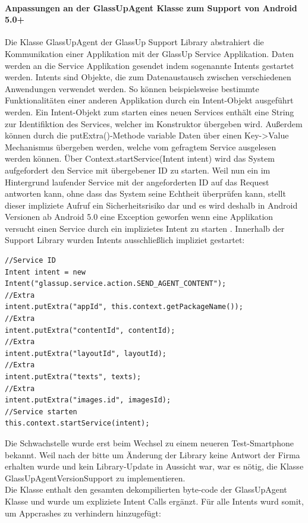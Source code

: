 \paragraph{Anpassungen an der GlassUpAgent Klasse zum Support von Android 5.0+}
Die Klasse GlassUpAgent der GlassUp Support Library abstrahiert die Kommunikation einer Applikation mit der GlassUp Service Applikation. Daten werden an die Service Applikation gesendet indem sogenannte Intents gestartet werden. Intents sind Objekte, die zum Datenaustausch zwischen verschiedenen Anwendungen verwendet werden. So können beispielsweise bestimmte Funktionalitäten einer anderen Applikation durch ein Intent-Objekt ausgeführt werden\cite{android_intents_2017}.
Ein Intent-Objekt zum starten eines neuen Services enthält eine String zur Identifiktion des Services, welcher im Konstruktor übergeben wird. Außerdem können durch die putExtra()-Methode variable Daten über einen Key->Value Mechanismus übergeben werden, welche vom gefragtem Service ausgelesen werden können.
Über Context.startService(Intent intent) wird das System aufgefordert den Service mit übergebener ID zu starten.
Weil nun ein im Hintergrund laufender Service mit der angeforderten ID auf das Request antworten kann, ohne dass das System seine Echtheit überprüfen kann, stellt dieser impliziete Aufruf ein Sicherheitsrisiko dar und es wird deshalb in Android Versionen ab Android 5.0 eine Exception geworfen wenn eine Applikation versucht einen Service durch ein implizietes Intent zu starten \cite{android_services_2017}.
Innerhalb der Support Library wurden Intents ausschließlich impliziet gestartet:
\begin{lstlisting}
//Service ID
Intent intent = new Intent("glassup.service.action.SEND_AGENT_CONTENT");
//Extra 
intent.putExtra("appId", this.context.getPackageName());
//Extra
intent.putExtra("contentId", contentId);
//Extra
intent.putExtra("layoutId", layoutId);
//Extra
intent.putExtra("texts", texts);
//Extra
intent.putExtra("images.id", imagesId);
//Service starten
this.context.startService(intent); 
\end{lstlisting}

Die Schwachstelle wurde erst beim Wechsel zu einem neueren Test-Smartphone bekannt. Weil nach der bitte um Änderung der Library keine Antwort der Firma erhalten wurde und kein Library-Update in Aussicht war, war es nötig, die Klasse GlassUpAgentVersionSupport zu implementieren.\\
Die Klasse enthalt den gesamten dekompilierten byte-code der GlassUpAgent Klasse und wurde um expliziete Intent Calls ergänzt. Für alle Intents wurd somit, um Appcrashes zu verhindern hinzugefügt:


